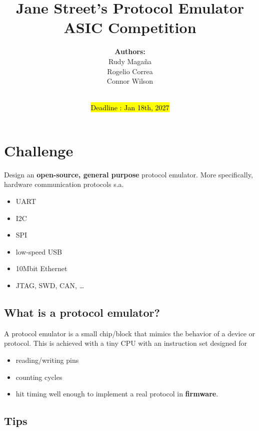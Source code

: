 \documentclass[a4paper]{report}
\title{\Huge{Jane Street's Protocol Emulator ASIC Competition }}
\author{\textbf{Authors:} \\Rudy Maga\~{n}a \\ Rogelio Correa \\ Connor Wilson \\ \\}
\date{\hl{Deadline : Jan 18th, 2027}}
\begin{document}
    \maketitle
	


	\tableofcontents

	\chapter{Challenge}

		Design an \textbf{open-source, general purpose} protocol emulator. 
		More specifically, hardware communication protocols s.a.
		\begin{itemize}
			\item UART
			\item I2C
			\item SPI
			\item low-speed USB
			\item 10Mbit Ethernet
			\item JTAG, SWD, CAN, \ldots
		\end{itemize}

		\section{What is a protocol emulator?}
			A protocol emulator is a small chip/block that mimics the 
			behavior of a device or protocol. This is achieved with a tiny
			CPU with an instruction set designed for 
			\begin{itemize}
				\item reading/writing pins
				\item counting cycles
				\item hit timing well enough to implement a real protocol in \textbf{firmware}.
			\end{itemize}

		\section{Tips}
\end{document}
